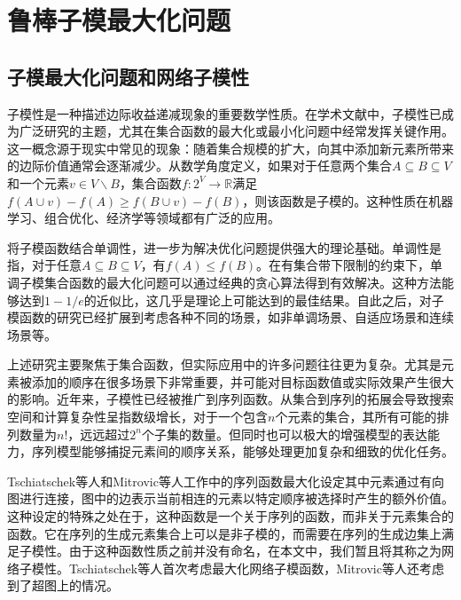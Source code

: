 \section{鲁棒子模最大化问题}
\label{sec:2_2}

\subsection{子模最大化问题和网络子模性}

子模性是一种描述边际收益递减现象的重要数学性质。在学术文献中，子模性已成为广泛研究的主题，尤其在集合函数的最大化或最小化问题中经常发挥关键作用\cite{nemhauser1978best,khuller1999budgeted}。这一概念源于现实中常见的现象：随着集合规模的扩大，向其中添加新元素所带来的边际价值通常会逐渐减少。从数学角度定义，如果对于任意两个集合$A\subseteq B \subseteq V$和一个元素$v\in V\backslash B$，集合函数$f: 2^V \to \mathbb{R}$满足$f(A\cup v) - f(A) \ge f(B\cup v) -f(B)$，则该函数是子模的。这种性质在机器学习、组合优化、经济学等领域都有广泛的应用\cite{krause2005near,lin2011class,shi2021profit,kirchhoff2014submodularity,gabillon2013adaptive,kempe2003maximizing,wang2021efficient}。

将子模函数结合单调性，进一步为解决优化问题提供强大的理论基础。单调性是指，对于任意$A\subseteq B\subseteq V$，有$f(A)\le f(B)$。在有集合带下限制的约束下，单调子模集合函数的最大化问题可以通过经典的贪心算法得到有效解决。这种方法能够达到$1−1/e$的近似比\cite{nemhauser1978best}，这几乎是理论上可能达到的最佳结果。自此之后，对子模函数的研究已经扩展到考虑各种不同的场景，如非单调场景、自适应场景和连续场景等\cite{feige2007maximizing,golovin2011adaptive,das2011submodular,bach2019submodular,shi2019adaptive}。

上述研究主要聚焦于集合函数，但实际应用中的许多问题往往更为复杂。尤其是元素被添加的顺序在很多场景下非常重要，并可能对目标函数值或实际效果产生很大的影响。近年来，子模性已经被推广到序列函数\cite{zhang2015string,tschiatschek2017selecting,streeter2008online,zhang2013near}。从集合到序列的拓展会导致搜索空间和计算复杂性呈指数级增长，对于一个包含$n$个元素的集合，其所有可能的排列数量为$n!$，远远超过$2^n$个子集的数量。但同时也可以极大的增强模型的表达能力，序列模型能够捕捉元素间的顺序关系，能够处理更加复杂和细致的优化任务。

Tschiatschek等人\cite{tschiatschek2017selecting}和Mitrovic等人\cite{mitrovic2018submodularity}工作中的序列函数最大化设定其中元素通过有向图进行连接，图中的边表示当前相连的元素以特定顺序被选择时产生的额外价值。这种设定的特殊之处在于，这种函数是一个关于序列的函数，而非关于元素集合的函数。它在序列的生成元素集合上可以是非子模的，而需要在序列的生成边集上满足子模性。由于这种函数性质之前并没有命名，在本文中，我们暂且将其称之为网络子模性。Tschiatschek等人\cite{tschiatschek2017selecting}首次考虑最大化网络子模函数，Mitrovic等人\cite{mitrovic2018submodularity}还考虑到了超图上的情况。

